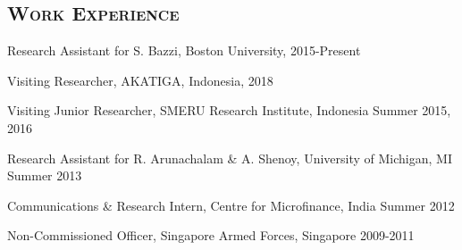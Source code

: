 \documentclass[11pt,overlapped,line,letterpaper]{res}
\newenvironment{list1}{
  \begin{list}{\ding{113}}{%
      \setlength{\itemsep}{0in} \setlength{\itemindent}{-1.6em}
      \setlength{\parsep}{0in} \setlength{\parskip}{0in}
      \setlength{\topsep}{0in} \setlength{\partopsep}{0in}
      \setlength{\leftmargin}{0.5in}}}{\end{list}}
\begin{document}
\begin{resume}
\section{\textbf{\textsc{Work Experience}}}
\begin{list1}
\item[] Research Assistant for S. Bazzi, Boston University, \hfill{2015-Present}
\item[] Visiting Researcher, AKATIGA, Indonesia, \hfill{2018}
\item[] Visiting Junior Researcher, SMERU Research Institute, Indonesia \hfill{Summer 2015, 2016}
\item[] Research Assistant for R. Arunachalam \& A. Shenoy, University of Michigan, MI \hfill{Summer 2013}
\item[] Communications \& Research Intern, Centre for Microfinance,  India \hfill{Summer 2012}
\vspace{7pt}
\item[] Non-Commissioned Officer, Singapore Armed Forces, Singapore \hfill{2009-2011}
\end{list1}
\vspace{-4.5pt}




\end{resume}
\end{document}
